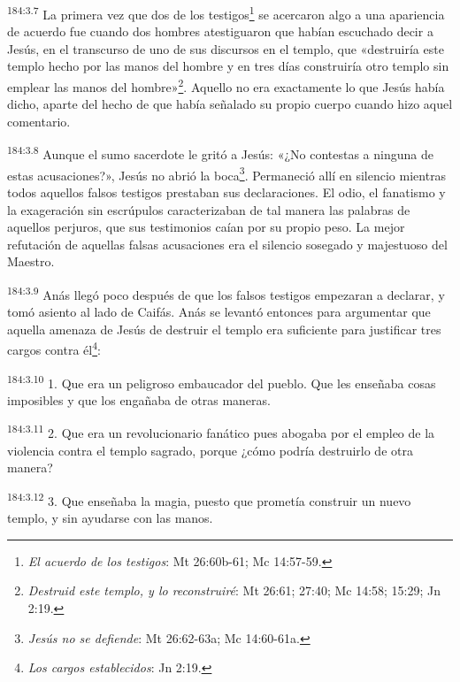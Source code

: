 \par 
\textsuperscript{184:3.7} La primera vez que dos de los testigos\footnote{\textit{El acuerdo de los testigos}: Mt 26:60b-61; Mc 14:57-59.} se acercaron algo a una apariencia de acuerdo fue cuando dos hombres atestiguaron que habían escuchado decir a Jesús, en el transcurso de uno de sus discursos en el templo, que «destruiría este templo hecho por las manos del hombre y en tres días construiría otro templo sin emplear las manos del hombre»\footnote{\textit{Destruid este templo, y lo reconstruiré}: Mt 26:61; 27:40; Mc 14:58; 15:29; Jn 2:19.}. Aquello no era exactamente lo que Jesús había dicho, aparte del hecho de que había señalado su propio cuerpo cuando hizo aquel comentario.

\par 
\textsuperscript{184:3.8} Aunque el sumo sacerdote le gritó a Jesús: «¿No contestas a ninguna de estas acusaciones?», Jesús no abrió la boca\footnote{\textit{Jesús no se defiende}: Mt 26:62-63a; Mc 14:60-61a.}. Permaneció allí en silencio mientras todos aquellos falsos testigos prestaban sus declaraciones. El odio, el fanatismo y la exageración sin escrúpulos caracterizaban de tal manera las palabras de aquellos perjuros, que sus testimonios caían por su propio peso. La mejor refutación de aquellas falsas acusaciones era el silencio sosegado y majestuoso del Maestro.

\par 
\textsuperscript{184:3.9} Anás llegó poco después de que los falsos testigos empezaran a declarar, y tomó asiento al lado de Caifás. Anás se levantó entonces para argumentar que aquella amenaza de Jesús de destruir el templo era suficiente para justificar tres cargos contra él\footnote{\textit{Los cargos establecidos}: Jn 2:19.}:

\par 
\textsuperscript{184:3.10} 1. Que era un peligroso embaucador del pueblo. Que les enseñaba cosas imposibles y que los engañaba de otras maneras.

\par 
\textsuperscript{184:3.11} 2. Que era un revolucionario fanático pues abogaba por el empleo de la violencia contra el templo sagrado, porque ¿cómo podría destruirlo de otra manera?

\par 
\textsuperscript{184:3.12} 3. Que enseñaba la magia, puesto que prometía construir un nuevo templo, y sin ayudarse con las manos.

